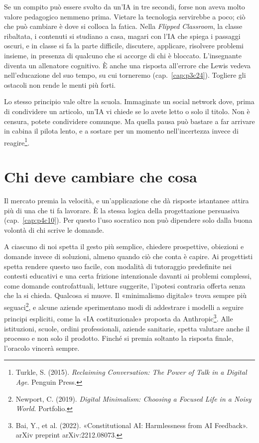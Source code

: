 Se un compito può essere svolto da un'IA in tre secondi, forse non aveva molto valore pedagogico nemmeno prima. Vietare la tecnologia servirebbe a poco; ciò che può cambiare è dove si colloca la fatica. Nella \textit{Flipped Classroom}, la classe ribaltata, i contenuti si studiano a casa, magari con l'IA che spiega i passaggi oscuri, e in classe si fa la parte difficile, discutere, applicare, risolvere problemi insieme, in presenza di qualcuno che si accorge di chi è bloccato. L'insegnante diventa un allenatore cognitivo. È anche una risposta all'errore che Lewis vedeva nell'educazione del suo tempo, su cui torneremo (cap.~\ref{cap:p3c24}). Togliere gli ostacoli non rende le menti più forti.

Lo stesso principio vale oltre la scuola. Immaginate un social network dove, prima di condividere un articolo, un'IA vi chiede se lo avete letto o solo il titolo. Non è censura, potete condividere comunque. Ma quella pausa può bastare a far arrivare in cabina il pilota lento, e a sostare per un momento nell'incertezza invece di reagire\footnote{Turkle, S. (2015). \textit{Reclaiming Conversation: The Power of Talk in a Digital Age}. Penguin Press.}.

\section{Chi deve cambiare che cosa}

Il mercato premia la velocità, e un'applicazione che dà risposte istantanee attira più di una che ti fa lavorare. È la stessa logica della progettazione persuasiva (cap.~\ref{cap:p4c10}). Per questo l'uso socratico non può dipendere solo dalla buona volontà di chi scrive le domande.

A ciascuno di noi spetta il gesto più semplice, chiedere prospettive, obiezioni e domande invece di soluzioni, almeno quando ciò che conta è capire. Ai progettisti spetta rendere questo uso facile, con modalità di tutoraggio predefinite nei contesti educativi e una certa frizione intenzionale davanti ai problemi complessi, come domande controfattuali, letture suggerite, l'ipotesi contraria offerta senza che la si chieda. Qualcosa si muove. Il «minimalismo digitale» trova sempre più seguaci\footnote{Newport, C. (2019). \textit{Digital Minimalism: Choosing a Focused Life in a Noisy World}. Portfolio.}, e alcune aziende sperimentano modi di addestrare i modelli a seguire principi espliciti, come la «IA costituzionale» proposta da Anthropic\footnote{Bai, Y., et al. (2022). «Constitutional AI: Harmlessness from AI Feedback». arXiv preprint arXiv:2212.08073.}. Alle istituzioni, scuole, ordini professionali, aziende sanitarie, spetta valutare anche il processo e non solo il prodotto. Finché si premia soltanto la risposta finale, l'oracolo vincerà sempre.

